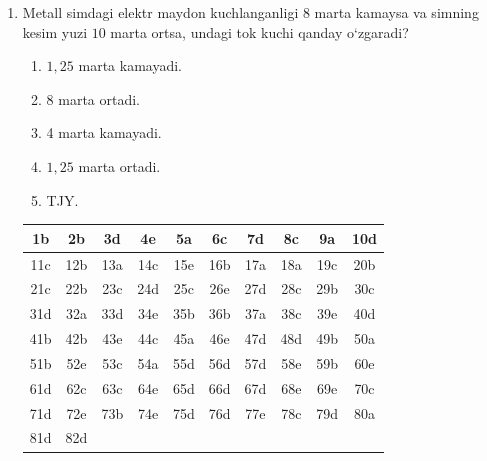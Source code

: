 \begin{enumerate}
\item Metall simdagi elektr maydon kuchlanganligi $8$ marta kamaysa va simning kesim yuzi $10$ marta ortsa, undagi tok kuchi qanday o‘zgaradi?
\begin{enumerate}[label=\Alph*)]
\item $1,25$ marta kamayadi.
\item 8 marta ortadi.
\item 4 marta kamayadi.
\item $1,25$ marta ortadi.
\item TJY.
\end{enumerate}



\begin{table}[h!]
\centering
\begin{tabular}{|c|c|c|c|c|c|c|c|c|c|}
\hline
1b & 2b & 3d & 4e & 5a & 6c & 7d & 8c & 9a & 10d \\ \hline
11c & 12b & 13a & 14c & 15e & 16b & 17a & 18a & 19c & 20b \\ \hline
21c & 22b & 23c & 24d & 25c & 26e & 27d & 28c & 29b & 30c \\ \hline
31d & 32a & 33d & 34e & 35b & 36b & 37a & 38c & 39e & 40d \\ \hline
41b & 42b & 43e & 44c & 45a & 46e & 47d & 48d & 49b & 50a \\ \hline
51b & 52e & 53c & 54a & 55d & 56d & 57d & 58e & 59b & 60e \\ \hline
61d & 62c & 63c & 64e & 65d & 66d & 67d & 68e & 69e & 70c \\ \hline
71d & 72e & 73b & 74e & 75d & 76d & 77e & 78c & 79d & 80a \\ \hline
81d & 82d &  &  &  &  &  &  &  &  \\ \hline
\end{tabular}
\end{table}





\end{enumerate}